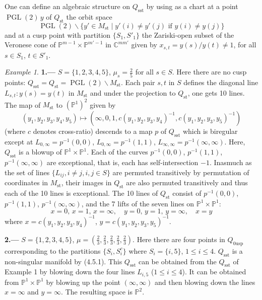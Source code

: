 \documentclass[12pt,a4paper]{article}
\theoremstyle{plain}
\theoremstyle{definition}
\theoremstyle{remark}
\newtheorem{example}[theorem]{Example}
\DeclareMathOperator{\PGL}{PGL}
\newcommand{\CC}{\mathbb{C}}
\newcommand{\PP}{\mathbb{P}}
\numberwithin{equation}{section}
\providecommand{\CC}{\mathbb{C}}
\providecommand{\PP}{\mathbb{P}}
\providecommand{\PGL}{\operatorname{PGL}}
\begin{document}
One can define an algebraic structure on $Q_{\mathrm{sst}}$ by using as a chart at a point $\PGL(2) \, y$ of $Q_{\mathrm{st}}$ the orbit space
\[
\PGL(2) \backslash \{y' \in M_{\mathrm{st}} \mid y'(i) \neq y'(j) \text{ if } y(i) \neq y(j)\}
\]
and at a cusp point with partition $\{S_1, S'_1\}$ the Zariski-open subset of the Veronese cone of $\PP^{m-1} \times \PP^{m'-1}$ in $\CC^{mm'}$ given by $x_{s,t} = y(s)/y(t) \neq 1$, for all $s \in S_1$, $t \in S'_1$.

\begin{example}
\textbf{1.---} $S = \{1, 2, 3, 4, 5\}$, $\mu_s = \frac{2}{5}$ for all $s \in S$. Here there are no cusp points: $Q_{\mathrm{sst}} = Q_{\mathrm{st}} = \PGL(2) \backslash M_{\mathrm{st}}$. Each pair $s, t$ in $S$ defines the diagonal line $L_{s,t}: y(s) = y(t)$ in $M_{\mathrm{st}}$ and under the projection to $Q_{\mathrm{st}}$, one gets 10 lines. The map of $M_{\mathrm{st}}$ to $(\PP^1)^2$ given by
\[
(y_1, y_2, y_3, y_4, y_5) \mapsto (\infty, 0, 1, c(y_1, y_2, y_3, y_4)^{-1}, c(y_1, y_2, y_3, y_5)^{-1})
\]
(where $c$ denotes cross-ratio) descends to a map $p$ of $Q_{\mathrm{sst}}$ which is biregular except at $L_{0,\infty} = p^{-1}(0,0)$, $L_{0,\infty} = p^{-1}(1,1)$, $L_{\infty,\infty} = p^{-1}(\infty, \infty)$. Here, $Q_{\mathrm{sst}}$ is a blowup of $\PP^1 \times \PP^1$. Each of the curves $p^{-1}(0,0)$, $p^{-1}(1,1)$, $p^{-1}(\infty, \infty)$ are exceptional, that is, each has self-intersection $-1$. Inasmuch as the set of lines $\{L_{ij}, i \neq j, i, j \in S\}$ are permuted transitively by permutation of coordinates in $M_{\mathrm{st}}$, their images in $Q_{\mathrm{st}}$ are also permuted transitively and thus each of the 10 lines is exceptional. The 10 lines of $Q_{\mathrm{st}}$ consist of $p^{-1}(0,0)$, $p^{-1}(1,1)$, $p^{-1}(\infty, \infty)$, and the 7 lifts of the seven lines on $\PP^1 \times \PP^1$:
\[
x = 0, \, x = 1, \, x = \infty, \quad y = 0, \, y = 1, \, y = \infty, \quad x = y
\]
where $x = c(y_1, y_2, y_3, y_4)^{-1}$, $y = c(y_1, y_2, y_3, y_5)^{-1}$.

\textbf{2.---} $S = \{1, 2, 3, 4, 5\}$, $\mu = (\frac{2}{3}, \frac{2}{3}, \frac{2}{3}, \frac{2}{3}, \frac{2}{3})$. Here there are four points in $Q_{0\mathrm{usp}}$ corresponding to the partitions $\{S_i, S^c_i\}$ where $S_i = \{i, 5\}$, $1 \leq i \leq 4$. $Q_{\mathrm{sst}}$ is a non-singular manifold by (4.5.1). This $Q_{\mathrm{sst}}$ can be obtained from the $Q_{\mathrm{sst}}$ of Example 1 by blowing down the four lines $L_{i,5}$ ($1 \leq i \leq 4$). It can be obtained from $\PP^1 \times \PP^1$ by blowing up the point $(\infty, \infty)$ and then blowing down the lines $x = \infty$ and $y = \infty$. The resulting space is $\PP^2$.
\end{example}
\end{document}
